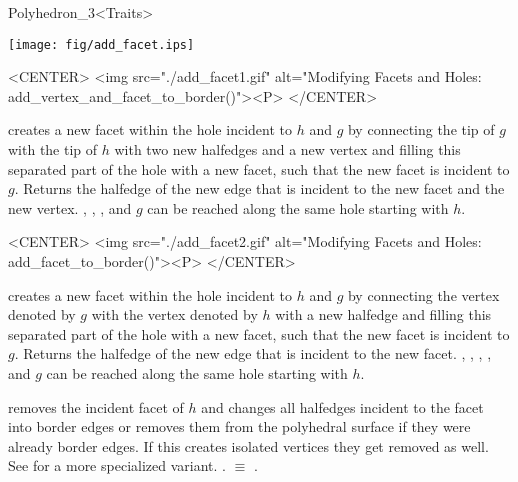 \begin{ccRefClass}{Polyhedron_3<Traits>}
\begin{ccTexOnly}
    \begin{center}
      \parbox{\textwidth}{%
          \texttt{[image: fig/add\_facet.ips]}%
      }
    \end{center}
\end{ccTexOnly}

\begin{ccHtmlOnly}
    <CENTER>
    <img src="./add_facet1.gif" 
     alt="Modifying Facets and Holes: add_vertex_and_facet_to_border()"><P>
    </CENTER>
\end{ccHtmlOnly}


   {creates a new facet within the hole incident to $h$
   and $g$ by connecting the tip of $g$ with the tip of $h$ 
   with two new halfedges and a new vertex and filling this separated
   part of the hole with a new facet, such that the new facet is
   incident to $g$. Returns the halfedge of the new edge that is
   incident to the new facet and the new vertex.
    \ccPrecond {}, , , 
    and $g$ can be reached along the same hole starting with $h$.}

\begin{ccHtmlOnly}
    <CENTER>
    <img src="./add_facet2.gif" 
     alt="Modifying Facets and Holes: add_facet_to_border()"><P>
    </CENTER>
\end{ccHtmlOnly}

   {creates a new facet within the hole incident to $h$ and $g$ by
    connecting the vertex denoted by $g$ with the vertex denoted by $h$
    with a new halfedge and filling this separated part of the hole with
    a new facet, such that the new facet is incident to $g$. 
    Returns the halfedge of the new edge that is incident to the new facet.
   \ccPrecond {}, , , 
   , and $g$ can be reached along the same hole
   starting with $h$.}



    {removes the incident facet of $h$ and changes all halfedges incident 
     to the facet into border edges or removes them from the
     polyhedral surface if they were already border edges.
     If this creates isolated vertices they get removed as well.
     See  for a more specialized variant.    
     \ccPrecond {}. 
      $\equiv$ .}


\end{ccRefClass}
